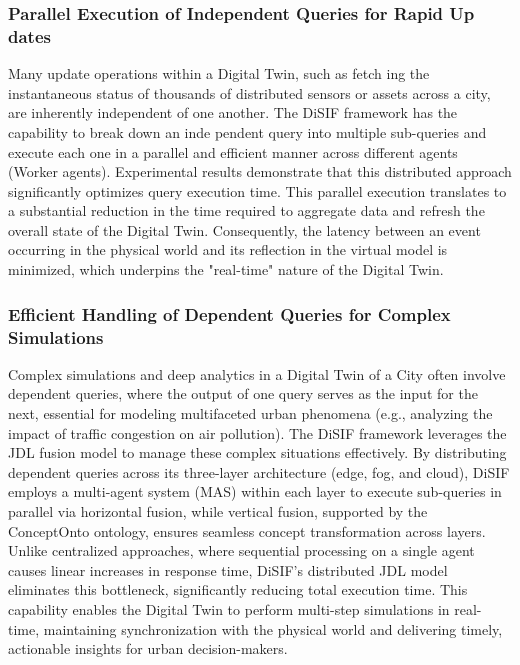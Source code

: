 \documentclass[5p,times]{elsarticle}
\begin{document}
\subsubsection{ Parallel Execution of Independent Queries for Rapid Up dates}

Many update operations within a Digital Twin, such as fetch
ing the instantaneous status of thousands of distributed sensors
 or assets across a city, are inherently independent of one another.
 The DiSIF framework has the capability to break down an inde
pendent query into multiple sub-queries and execute each one in
 a parallel and efficient manner across different agents (Worker
 agents). Experimental results demonstrate that this distributed
 approach significantly optimizes query execution time.
 This parallel execution translates to a substantial reduction
 in the time required to aggregate data and refresh the overall
 state of the Digital Twin. Consequently, the latency between
 an event occurring in the physical world and its reflection in
 the virtual model is minimized, which underpins the "real-time"
 nature of the Digital Twin.


 \subsubsection{ Efficient Handling of Dependent Queries for Complex Simulations}

 Complex simulations and deep analytics in a Digital Twin of a City often
  involve dependent queries, where the output of one query serves as the input
   for the next, essential for modeling multifaceted urban phenomena (e.g., analyzing
    the impact of traffic congestion on air pollution). The DiSIF framework leverages
     the JDL fusion model to manage these complex situations effectively.
      By distributing dependent queries across its three-layer architecture
       (edge, fog, and cloud), DiSIF employs a multi-agent system (MAS) within
        each layer to execute sub-queries in parallel via horizontal fusion,
         while vertical fusion, supported by the ConceptOnto ontology, ensures
          seamless concept transformation across layers. Unlike centralized 
          approaches, where sequential processing on a single agent causes linear
           increases in response time, DiSIF’s distributed JDL model eliminates
            this bottleneck, significantly reducing total execution time. 
            This capability enables the Digital Twin to perform multi-step
             simulations in real-time, maintaining synchronization with the
              physical world and delivering timely, actionable insights for urban decision-makers.
\end{document}
